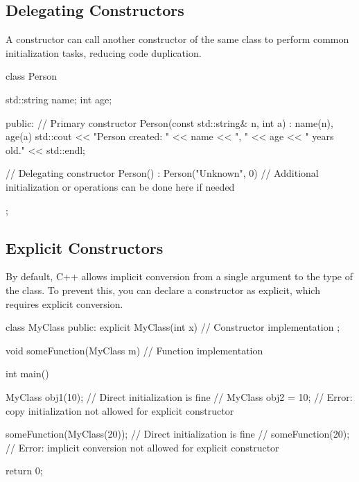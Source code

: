 \documentclass{report}
\begin{document}
    \bigbreak \noindent 
    \subsection{Delegating Constructors}
    \bigbreak \noindent 
    \begin{concept}
        A constructor can call another constructor of the same class to perform common initialization tasks, reducing code duplication.
    \end{concept}
    \bigbreak \noindent 
    \begin{cppcode}
class Person {
    std::string name;
    int age;

public:
    // Primary constructor
    Person(const std::string& n, int a) : name(n), age(a) {
        std::cout << "Person created: " << name << ", " << age << " years old." << std::endl;
    }

    // Delegating constructor
    Person() : Person("Unknown", 0) {
        // Additional initialization or operations can be done here if needed
    }
};
    \end{cppcode}
    

    \bigbreak \noindent 
    \subsection{Explicit Constructors}
    \bigbreak \noindent 
    \begin{concept}
         By default, C++ allows implicit conversion from a single argument to the type of the class. To prevent this, you can declare a constructor as explicit, which requires explicit conversion.
    \end{concept}
    \bigbreak \noindent 
    \begin{cppcode}
class MyClass {
public:
    explicit MyClass(int x) {
        // Constructor implementation
    }
};

void someFunction(MyClass m) {
    // Function implementation
}

int main() {
    MyClass obj1(10); // Direct initialization is fine
    // MyClass obj2 = 10; // Error: copy initialization not allowed for explicit constructor

    someFunction(MyClass(20)); // Direct initialization is fine
    // someFunction(20); // Error: implicit conversion not allowed for explicit constructor

    return 0;
}   \end{cppcode}
    

    \pagebreak
\end{document}
